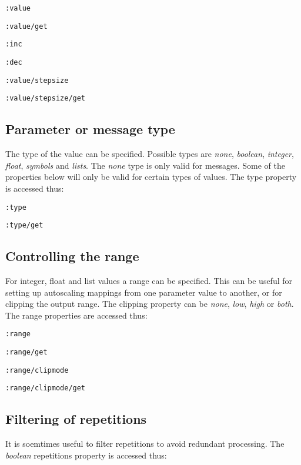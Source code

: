 \documentclass{sig-alternate}
\begin{document}
\texttt{:value}

\texttt{:value/get}

\texttt{:inc}

\texttt{:dec} 

\texttt{:value/stepsize}

\texttt{:value/stepsize/get}




\subsection{Parameter or message type} %
\label{sub:type}

The type of the value can be specified. Possible types are \emph{none}, \emph{boolean}, \emph{integer}, \emph{float}, \emph{symbols} and \emph{lists}. The \emph{none} type is only valid for messages. Some of the properties below will only be valid for certain types of values. The type property is accessed thus:

\texttt{:type}

\texttt{:type/get}



\subsection{Controlling the range} %
\label{sub:range}

For integer, float and list values a range can be specified. This can be useful for setting up autoscaling mappings from one parameter value to another, or for clipping the output range. The clipping property can be \emph{none}, \emph{low}, \emph{high} or \emph{both}. The range properties are accessed thus:

\texttt{:range}

\texttt{:range/get}

\texttt{:range/clipmode}

\texttt{:range/clipmode/get}



\subsection{Filtering of repetitions} %
\label{sub:filtering_of_repetitions}

It is soemtimes useful to filter repetitions to avoid redundant processing. The \emph{boolean} repetitions property is accessed thus:
\end{document}

